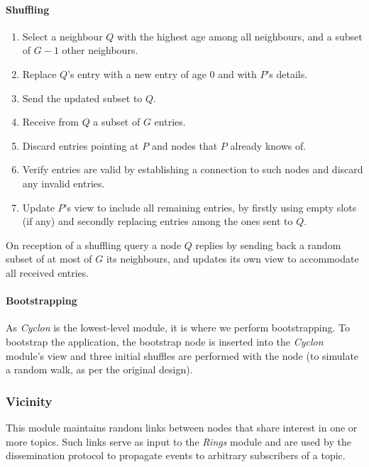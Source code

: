 \documentclass[10pt,a4paper,onecolumn]{article}
\begin{document}
\paragraph*{Shuffling}
\begin{enumerate}
\item Select a neighbour $Q$ with the highest age among all neighbours, and a subset of $G-1$ other neighbours.
\item Replace $Q$'s entry with a new entry of age 0 and with $P$'s details.
\item Send the updated subset to $Q$.
\item Receive from $Q$ a subset of $G$ entries.
\item Discard entries pointing at $P$ and nodes that $P$ already knows of.
\item Verify entries are valid by establishing a connection to such nodes and discard any invalid entries.
\item Update $P$'s view to include all remaining entries, by firstly using empty slots (if any) and secondly replacing entries among the ones sent to $Q$.
\end{enumerate}

On reception of a shuffling query a node $Q$ replies by sending back a random subset of at most of $G$ its neighbours, and updates its own view to accommodate all received entries.

\paragraph*{Bootstrapping}
As \textit{Cyclon} is the lowest-level module, it is where we perform bootstrapping. To bootstrap the application, the bootstrap node is inserted into the \textit{Cyclon} module's view and three initial shuffles are performed with the node (to simulate a random walk, as per the original design).

\subsubsection{Vicinity}
This module maintains random links between nodes that share interest in one or more topics. Such links serve as input to the \textit{Rings} module and are used by the dissemination protocol to propagate events to arbitrary subscribers of a topic.
\end{document}
